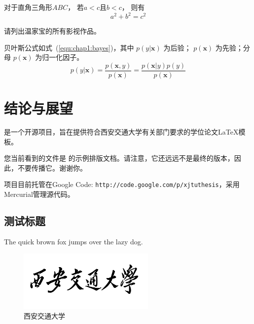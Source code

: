 \documentclass[
    bachelor, 
    ]{xjtuthesis}
\begin{document}
            \begin{theorem}
              \rm 对于直角三角形$ABC$， 若$a<c$且$b<c$， 则有
                \begin{equation}
                  a^2+b^2=c^2
                \end{equation}
            \end{theorem}


            \begin{exercise}
                  \rm 请列出温家宝的所有影视作品。
            \end{exercise}
                
            贝叶斯公式如式~(\ref{equ:chap1:bayes})，其中 $p(y|\mathbf{x})$ 为后验；
            $p(\mathbf{x})$ 为先验；分母 $p(\mathbf{x})$ 为归一化因子。
            \begin{equation}
                \label{equ:chap1:bayes}
                p(y|\mathbf{x}) = \frac{p(\mathbf{x},y)}{p(\mathbf{x})}=
                \frac{p(\mathbf{x}|y)p(y)}{p(\mathbf{x})} 
            \end{equation}


    \chapter{结论与展望}

        \xjtuthesis 是一个开源项目，旨在提供符合西安交通大学有关部门要求的学位论文\LaTeX 模板。

        您当前看到的文件是 \xjtuthesis{} \metaversion 的示例排版文档。请注意，它还远远不是最终的版本，因此，不要传播它。谢谢你。

        \xjtuthesis 项目目前托管在Google Code: \verb|http://code.google.com/p/xjtuthesis|，采用Mercurial管理源代码。


    \xjtuappendix


            \section{测试标题}

                The quick brown fox jumps over the lazy dog.

                \begin{figure}[h!]
                  \centering
                  \includegraphics[width=6.67cm]{XJTU.pdf}
                  \caption{西安交通大学}
                  \label{fig:in-appendix}
                \end{figure}
\end{document}
